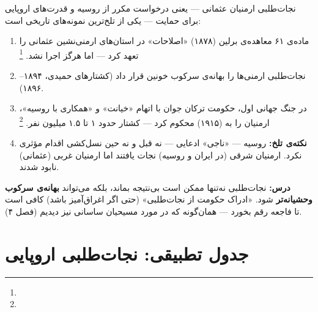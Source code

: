 \begin{tcolorbox}[enemybox, title={فاجعه‌ی ارمنیان عثمانی: تلخ‌ترین نمونه‌ی نجات‌طلبی}]
نجات‌طلبی ارمنیان عثمانی — یعنی درخواست مکرر از روسیه و قدرت‌های اروپایی برای حمایت — یکی از تلخ‌ترین نمونه‌های تاریخی است:

\begin{enumerate}[nosep, label=\textbf{\arabic*.}]
  \item ماده‌ی ۶۱ معاهده‌ی برلین (۱۸۷۸) «اصلاحات» در استان‌های ارمنی‌نشین عثمانی را تعهد کرد — اما هرگز اجرا نشد.%
  \footnote{}
  \item {} نجات‌طلبی ارمنی‌ها را بهانه‌ی سرکوب خونین قرار داد (کشتارهای حمیدی، ۱۸۹۴–۱۸۹۶).
  \item در جنگ جهانی اول، حکومت ترکان جوان با اتهام «خیانت» و «همکاری با روسیه»، ارمنیان را به  (۱۹۱۵) محکوم کرد — کشتار حدود ۱ تا ۱.۵ میلیون نفر.%
  \footnote{}
  \item \textbf{نکته‌ی تلخ:} روسیه — «ناجی» ادعایی — نه قبل و نه حین نسل‌کشی اقدام مؤثری نکرد. ارمنیان شرقی (در ایران و روسیه) نجات یافتند اما ارمنیان غربی (عثمانی) نابود شدند.
\end{enumerate}

\textbf{درس:} نجات‌طلبی نه‌تنها ممکن است بی‌نتیجه بماند، بلکه می‌تواند \textbf{بهانه‌ی سرکوب وحشیانه‌تر} شود. «ادراک حکومت از نجات‌طلبی» (حتی اگر اغراق‌آمیز باشد) کافی است تا فاجعه رقم بخورد — همان‌گونه که در مورد مسیحیان ساسانی نیز دیدیم (فصل ۴).
\end{tcolorbox}

\section{جدول تطبیقی: نجات‌طلبی اروپایی}
\label{sec:ch08-european-table}


